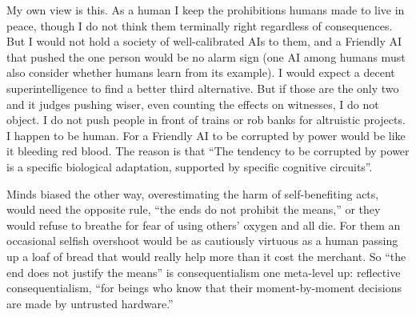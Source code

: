 My own view is this. As a human I keep the prohibitions humans made to live in peace, though I do not think them terminally right regardless of consequences. But I would not hold a society of well-calibrated AIs to them, and a Friendly AI that pushed the one person would be no alarm sign (one AI among humans must also consider whether humans learn from its example). I would expect a decent superintelligence to find a better third alternative. But if those are the only two and it judges pushing wiser, even counting the effects on witnesses, I do not object. I do not push people in front of trains or rob banks for altruistic projects. I happen to be human. For a Friendly AI to be corrupted by power would be like it bleeding red blood. The reason is that ``The tendency to be corrupted by power is a specific biological adaptation, supported by specific cognitive circuits''. 

Minds biased the other way, overestimating the harm of self-benefiting acts, would need the opposite rule, ``the ends do not prohibit the means,'' or they would refuse to breathe for fear of using others' oxygen and all die. For them an occasional selfish overshoot would be as cautiously virtuous as a human passing up a loaf of bread that would really help more than it cost the merchant. So ``the end does not justify the means'' is consequentialism one meta-level up: reflective consequentialism, ``for beings who know that their moment-by-moment decisions are made by untrusted hardware.'' 
